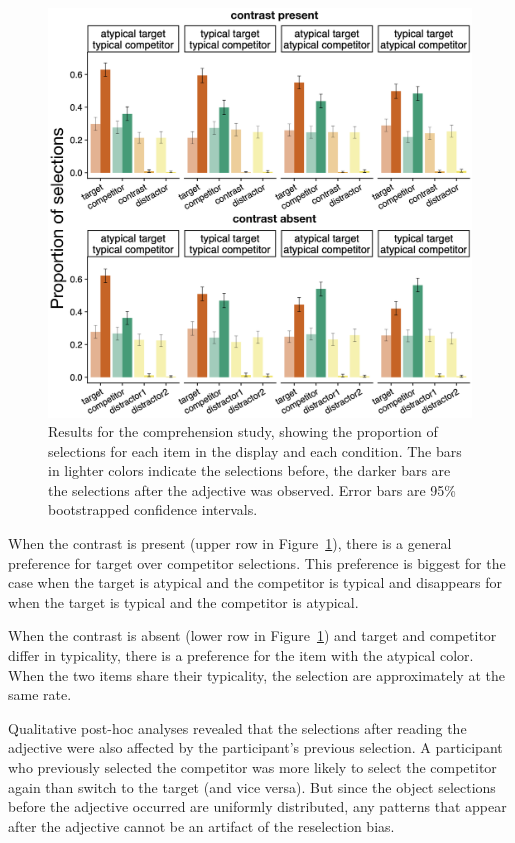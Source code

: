 \documentclass[10pt,letterpaper]{article}
\newcommand{\ek}[1]{\textcolor{Orange}{[ek: #1]}}
\begin{document}
\begin{figure}
	\begin{center}
		\includegraphics[width=.475\textwidth]{graphs/compr-results.pdf}
	\end{center}
\caption{Results for the comprehension study, showing the proportion of selections for each item in the display and each condition. The bars in lighter colors indicate the selections before, the darker bars are the selections after the adjective was observed. Error bars are 95\% bootstrapped confidence intervals.} 
\label{compr-results}
\end{figure}

When the contrast is present (upper row in Figure~\ref{compr-results}), there is a general preference for target over competitor selections. This preference is biggest for the case when the target is atypical and the competitor is typical and disappears for when the target is typical and the competitor is atypical. 

When the contrast is absent (lower row in Figure~\ref{compr-results}) and target and competitor differ in typicality, there is a preference for the item with the atypical color. When the two items share their typicality, the selection are approximately at the same rate. 


Qualitative post-hoc analyses revealed that the selections after reading the adjective were also affected by the participant's previous selection. A participant who previously selected the competitor was more likely to select the competitor again than switch to the target (and vice versa). But since the object selections before the adjective occurred are uniformly distributed, any patterns that appear after the adjective cannot be an artifact of the reselection bias.
\end{document}
